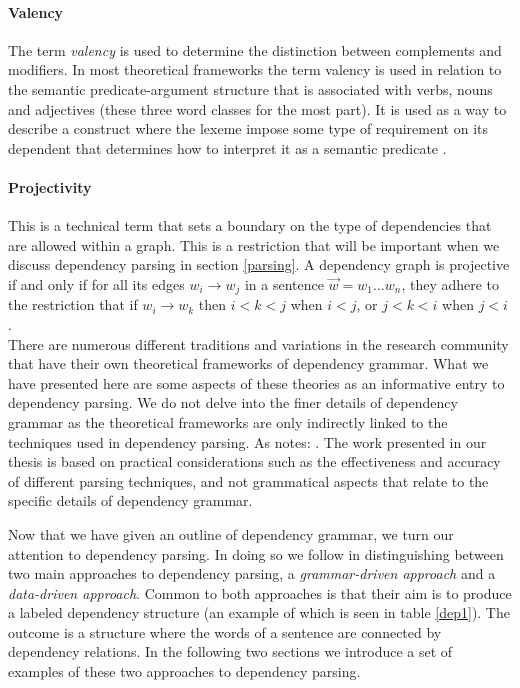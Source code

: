 \paragraph{Valency} The term \textit{valency} is used to determine the distinction between complements and modifiers. In most theoretical frameworks the term valency is used in relation to the semantic predicate-argument structure that is associated with verbs, nouns and adjectives (these three word classes for the most part). It is used as a way to describe a construct where the lexeme impose some type of requirement on its dependent that determines how to interpret it as a semantic predicate \cite{Niv:05}.

\paragraph{Projectivity} This is a technical term that sets a boundary on the type of dependencies that are allowed within a graph. This is a restriction that will be important when we discuss dependency parsing in section \ref{parsing}. A dependency graph is projective if and only if for all its edges $w_i \rightarrow w_j$ in a sentence $\vec{w} = w_1 ... w_n$, they adhere to the restriction that if $w_i \rightarrow w_k$ then $i < k < j$ when $i < j$, or $j < k < i$ when $j < i$ \cite{KublerEtAl:09}. \\

There are numerous different traditions and variations in the research community that have their own theoretical frameworks of dependency grammar. What we have presented here are some aspects of these theories as an informative entry to dependency parsing. We do not delve into the finer details of dependency grammar as the theoretical frameworks are only indirectly linked to the techniques used in dependency parsing. As \citeauthor{Niv:05} notes:  \cite{Niv:05}. The work presented in our thesis is based on practical considerations such as the effectiveness and accuracy of different parsing techniques, and not grammatical aspects that relate to the specific details of dependency grammar.

Now that we have given an outline of dependency grammar, we turn our attention to dependency parsing. In doing so we follow  in distinguishing between two main approaches to dependency parsing, a \textit{grammar-driven approach} and a \textit{data-driven approach}. Common to both approaches is that their aim is to produce a labeled dependency structure (an example of which is seen in table \ref{dep1}). The outcome is a structure where the words of a sentence are connected by dependency relations. In the following two sections we introduce a set of examples of these two approaches to dependency parsing.

